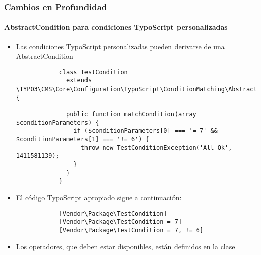 \begin{frame}[fragile]
	\frametitle{Cambios en Profundidad}
	\framesubtitle{AbstractCondition para condiciones TypoScript personalizadas}

	\lstset{
		basicstyle=\tiny\ttfamily
	}

	\begin{itemize}
		\item Las condiciones TypoScript personalizadas pueden derivarse de una AbstractCondition

		\begin{lstlisting}
			class TestCondition
			  extends \TYPO3\CMS\Core\Configuration\TypoScript\ConditionMatching\AbstractCondition {

			  public function matchCondition(array $conditionParameters) {
 			    if ($conditionParameters[0] === '= 7' && $conditionParameters[1] === '!= 6') {
			      throw new TestConditionException('All Ok', 1411581139);
			    }
			  }
			}
		\end{lstlisting}

		\item El código TypoScript apropiado sigue a continuación:

		\begin{lstlisting}
			[Vendor\Package\TestCondition]
			[Vendor\Package\TestCondition = 7]
			[Vendor\Package\TestCondition = 7, != 6]
		\end{lstlisting}

		\item Los operadores, que deben estar disponibles, están definidos en la clase

	\end{itemize}

\end{frame}


